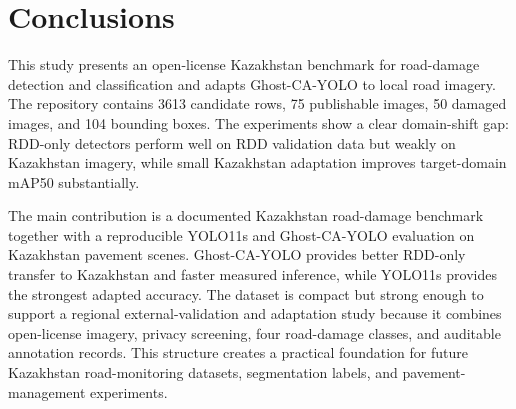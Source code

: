 \documentclass[applsci,article,submit,moreauthors]{Definitions/mdpi}
\begin{document}
\section{Conclusions}

This study presents an open-license Kazakhstan benchmark for road-damage detection and classification and adapts Ghost-CA-YOLO to local road imagery. The repository contains 3613 candidate rows, 75 publishable images, 50 damaged images, and 104 bounding boxes. The experiments show a clear domain-shift gap: RDD-only detectors perform well on RDD validation data but weakly on Kazakhstan imagery, while small Kazakhstan adaptation improves target-domain mAP50 substantially.

The main contribution is a documented Kazakhstan road-damage benchmark together with a reproducible YOLO11s and Ghost-CA-YOLO evaluation on Kazakhstan pavement scenes. Ghost-CA-YOLO provides better RDD-only transfer to Kazakhstan and faster measured inference, while YOLO11s provides the strongest adapted accuracy. The dataset is compact but strong enough to support a regional external-validation and adaptation study because it combines open-license imagery, privacy screening, four road-damage classes, and auditable annotation records. This structure creates a practical foundation for future Kazakhstan road-monitoring datasets, segmentation labels, and pavement-management experiments.

\vspace{6pt}



\end{document}

